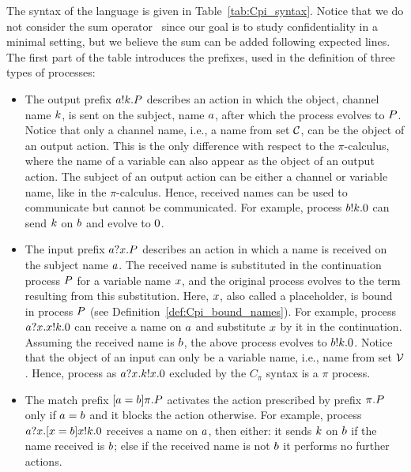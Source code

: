 The syntax of the language is given in Table~\ref{tab:Cpi_syntax}. Notice that we do not consider the sum operator~\cite{pi_calculus} since our goal is to study confidentiality in a minimal setting, but we believe the sum can be added following expected lines.
The first part of the table introduces the prefixes, used in the definition of three types of processes: 
%
\begin{itemize}
\item The output prefix $a!k.P$ describes an action in which the object, channel name $k$, is sent on the subject, name $a$,  after which the process evolves to $P$. 
Notice that only a channel name, i.e., a name from set ${\cal C}$, can be the object of an output action. 
This is the only difference with respect to the $\pi$-calculus, where the name of a variable can also appear as the object of an output action. 
The subject of an output action can be either a channel or variable name, like in the $\pi$-calculus. 
Hence, received names can be used to communicate but cannot be communicated. For example, process $b!k.0$ can send $k$ on $b$ and evolve to $0$.
%
\item The input prefix $a?x.P$ describes an action in which a name is received on the subject name $a$. The received name is substituted in the continuation process $P$ for a variable name $x$, and the original process evolves to the term resulting from this substitution. Here, $x$, also called a placeholder, is bound in process $P$ (see Definition~\ref{def:Cpi_bound_names}). 
For example, process $a?x.x!k.0$ can receive a name on $a$ and substitute $x$ by it in the continuation. 
Assuming the received name is $b$, the above process evolves to $b!k.0$. 
Notice that the object of an input can only be a variable name, i.e., name from set ${\cal V}$. 
Hence, process as $a?x.k!x.0$ excluded by the $C_\pi$ syntax is a $\pi$ process.
\item The match prefix $[ a = b ]\pi.P$ activates the action prescribed by prefix $\pi.P$ only if $a=b$ and it blocks the action otherwise. For example, process 
$a?x.[ x = b ]x!k.0$ 
receives a name on $a$, then either: it sends $k$ on $b$ if the name received is $b$; else if the received name is not $b$ it performs no further actions.
\end{itemize}

